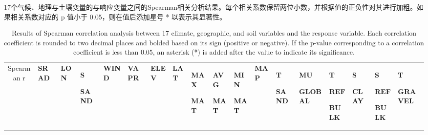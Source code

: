 \documentclass[AutoFakeBold]{LZUThesis-PgD&PhD}
\begin{document}
	
	\begin{landscape}  %
		\thispagestyle{empty}
		\begin{table}[H]
			
			
			\caption{17个气候、地理与土壤变量的与响应变量之间的Spearman相关分析结果。每个相关系数保留两位小数，并根据值的正负性对其进行加粗。如果相关系数对应的 p 值小于 0.05，则在值后添加星号 * 以表示其显著性。}
			\caption*{Results of Spearman correlation analysis between 17 climate, geographic, and soil variables and the response variable. Each correlation coefficient is rounded to two decimal places and bolded based on its sign (positive or negative). If the p-value corresponding to a correlation coefficient is less than 0.05, an asterisk (*) is added after the value to indicate its significance.}
			\label{tab:correlation_matrix}                                
			\tiny                                                         
			\begin{tabular}{p{1.6cm}p{0.68cm}p{0.68cm}p{0.68cm}p{0.68cm}p{0.68cm}p{0.68cm}p{0.68cm}p{0.68cm}p{0.68cm}p{0.68cm}p{0.68cm}p{0.68cm}p{0.68cm}p{0.68cm}p{0.68cm}p{0.68cm}p{0.68cm}}
				
				\multicolumn{1}{c}{Spearman r}  & \textbf{SRAD} & \textbf{LON} & \textbf{S} \par \textbf{SAND} & \textbf{WIND} & \textbf{VAPR} & \textbf{ELEV} & \textbf{LAT} & \textbf{MAX} \par \textbf{MAT} & \textbf{AVG} \par \textbf{MAT} & \textbf{MIN} \par \textbf{MAT} & \textbf{MAP} & \textbf{T} \par \textbf{SAND} & \textbf{MU} \par \textbf{GLOBAL} & \textbf{T} \par \textbf{REF} \par \textbf{BULK} & \textbf{S} \par \textbf{CLAY} & \textbf{S} \par \textbf{REF} \par \textbf{BULK} & \textbf{T} \par \textbf{GRAVEL} \\
				

\end{tabular}
\end{table}
\end{landscape}
\end{document}
